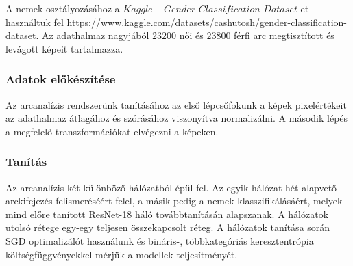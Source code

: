\documentclass[12pt,a4]{article}
\begin{document}
                
                A nemek osztályozásához a $Kaggle$ – $Gender$ $Classification$ $Dataset$-et használtuk fel \url{https://www.kaggle.com/datasets/cashutosh/gender-classification-dataset}. Az adathalmaz nagyjából $23 200$ női és $23 800$ férfi arc megtisztított és levágott képeit tartalmazza.
            \subsubsection{Adatok előkészítése}

                Az arcanalízis rendszerünk tanításához az első lépcsőfokunk a képek pixelértékeit az adathalmaz átlagához és szórásához viszonyítva normalizálni. A második lépés a megfelelő transzformációkat elvégezni a képeken.

            \subsubsection{Tanítás}
                
                    Az arcanalízis két különböző hálózatból épül fel. Az egyik hálózat hét alapvető arckifejezés felismeréséért felel, a másik pedig a nemek klasszifikálásáért,
                    melyek mind előre tanított ResNet-18 háló továbbtanításán alapszanak.
                    A hálózatok utolsó rétege egy-egy teljesen összekapcsolt réteg.
                    A hálózatok tanítása során SGD optimalizálót használunk és bináris-, többkategóriás keresztentrópia költségfüggvényekkel mérjük a modellek teljesítményét.
\end{document}
